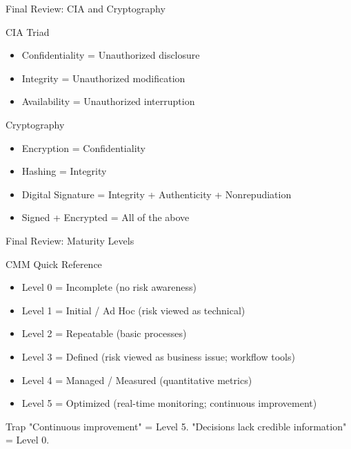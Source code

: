 \documentclass{beamer}
\begin{document}
	\begin{frame}{Final Review: CIA and Cryptography}
		\begin{block}{CIA Triad}
			\begin{itemize}
				\item Confidentiality = Unauthorized disclosure
				\item Integrity = Unauthorized modification
				\item Availability = Unauthorized interruption
			\end{itemize}
		\end{block}
		\begin{block}{Cryptography}
			\begin{itemize}
				\item Encryption = Confidentiality
				\item Hashing = Integrity
				\item Digital Signature = Integrity + Authenticity + Nonrepudiation
				\item Signed + Encrypted = All of the above
			\end{itemize}
		\end{block}
	\end{frame}
	
	\begin{frame}{Final Review: Maturity Levels}
		\begin{block}{CMM Quick Reference}
			\begin{itemize}
				\item Level 0 = Incomplete (no risk awareness)
				\item Level 1 = Initial / Ad Hoc (risk viewed as technical)
				\item Level 2 = Repeatable (basic processes)
				\item Level 3 = Defined (risk viewed as business issue; workflow tools)
				\item Level 4 = Managed / Measured (quantitative metrics)
				\item Level 5 = Optimized (real-time monitoring; continuous improvement)
			\end{itemize}
		\end{block}
		\begin{alertblock}{Trap}
			"Continuous improvement" = Level 5. "Decisions lack credible information" = Level 0.
		\end{alertblock}
	\end{frame}
	
\end{document}
